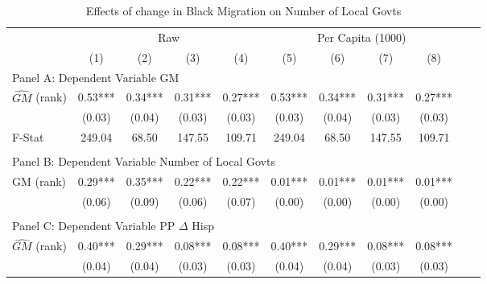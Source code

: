  \begin{table}[htbp]\centering {} \begin{threeparttable} \caption{Effects of change in Black Migration on Number of Local Govts} \begin{tabular}{l*{10}{c}} \toprule
                &\multicolumn{4}{c}{Raw}                                    &\multicolumn{4}{c}{Per Capita (1000)}                      \\\cmidrule(lr){2-5}\cmidrule(lr){6-9}
                &\multicolumn{1}{c}{(1)}   &\multicolumn{1}{c}{(2)}   &\multicolumn{1}{c}{(3)}   &\multicolumn{1}{c}{(4)}   &\multicolumn{1}{c}{(5)}   &\multicolumn{1}{c}{(6)}   &\multicolumn{1}{c}{(7)}   &\multicolumn{1}{c}{(8)}   \\
\cmidrule(lr){1-9}
\multicolumn{8}{l}{Panel A: Dependent Variable GM}\\
\cmidrule(lr){1-9}
$\hat{GM}$ (rank)&       0.53***&       0.34***&       0.31***&       0.27***&       0.53***&       0.34***&       0.31***&       0.27***\\
                &     (0.03)   &     (0.04)   &     (0.03)   &     (0.03)   &     (0.03)   &     (0.04)   &     (0.03)   &     (0.03)   \\
\midrule
F-Stat          &     249.04   &      68.50   &     147.55   &     109.71   &     249.04   &      68.50   &     147.55   &     109.71   \\
\cmidrule[\heavyrulewidth](lr){1-9} \\ \cmidrule[\heavyrulewidth](lr){1-9}
\multicolumn{8}{l}{Panel B: Dependent Variable Number of Local Govts}\\
\cmidrule(lr){1-9}
GM  (rank)      &       0.29***&       0.35***&       0.22***&       0.22***&       0.01***&       0.01***&       0.01***&       0.01***\\
                &     (0.06)   &     (0.09)   &     (0.06)   &     (0.07)   &     (0.00)   &     (0.00)   &     (0.00)   &     (0.00)   \\
\cmidrule[\heavyrulewidth](lr){1-9} \\ \cmidrule[\heavyrulewidth](lr){1-9}
\multicolumn{8}{l}{Panel C: Dependent Variable PP $\Delta$ Hisp}\\
\cmidrule(lr){1-9}
$\hat{GM}$ (rank)&       0.40***&       0.29***&       0.08***&       0.08***&       0.40***&       0.29***&       0.08***&       0.08***\\
                &     (0.04)   &     (0.04)   &     (0.03)   &     (0.03)   &     (0.04)   &     (0.04)   &     (0.03)   &     (0.03)   \\

\end{tabular}
\end{threeparttable}
\end{table}

